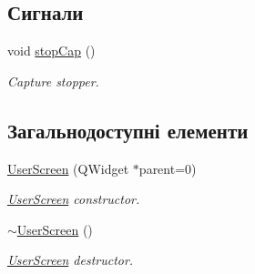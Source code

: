 \subsection*{Сигнали}
\begin{DoxyCompactItemize}
\item 
\hypertarget{classUserScreen_a6924ceec14a418da6b570949bca8523f}{void \hyperlink{classUserScreen_a6924ceec14a418da6b570949bca8523f}{stop\-Cap} ()}\label{classUserScreen_a6924ceec14a418da6b570949bca8523f}

\begin{DoxyCompactList}\small\item\em Capture stopper. \end{DoxyCompactList}\end{DoxyCompactItemize}
\subsection*{Загальнодоступні елементи}
\begin{DoxyCompactItemize}
\item 
\hyperlink{classUserScreen_a27136456b8f1b4d10dfe1cbfc9c43d7c}{User\-Screen} (Q\-Widget $\ast$parent=0)
\begin{DoxyCompactList}\small\item\em \hyperlink{classUserScreen}{User\-Screen} constructor. \end{DoxyCompactList}\item 
\hypertarget{classUserScreen_a30ef13619f5f42c72064ccd57df79e82}{\hyperlink{classUserScreen_a30ef13619f5f42c72064ccd57df79e82}{$\sim$\-User\-Screen} ()}\label{classUserScreen_a30ef13619f5f42c72064ccd57df79e82}

\begin{DoxyCompactList}\small\item\em \hyperlink{classUserScreen}{User\-Screen} destructor. \end{DoxyCompactList}\end{DoxyCompactItemize}
